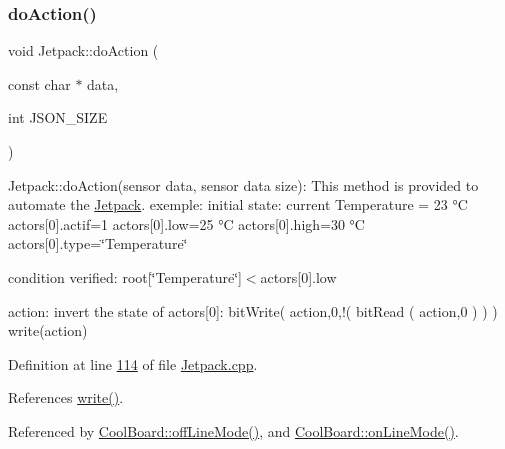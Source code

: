 \subsubsection{\texorpdfstring{do\+Action()}{doAction()}}
{\footnotesize\ttfamily void Jetpack\+::do\+Action (\begin{DoxyParamCaption}\item[{const char $\ast$}]{data,  }\item[{int}]{J\+S\+O\+N\+\_\+\+S\+I\+ZE }\end{DoxyParamCaption})}

Jetpack\+::do\+Action(sensor data, sensor data size)\+: This method is provided to automate the \hyperlink{class_jetpack}{Jetpack}. exemple\+: initial state\+: current Temperature = 23 °C actors\mbox{[}0\mbox{]}.actif=1 actors\mbox{[}0\mbox{]}.low=25 °C actors\mbox{[}0\mbox{]}.high=30 °C actors\mbox{[}0\mbox{]}.type=\char`\"{}\+Temperature\char`\"{}

condition verified\+: root\mbox{[}\char`\"{}\+Temperature\char`\"{}\mbox{]}$<$actors\mbox{[}0\mbox{]}.low

action\+: invert the state of actors\mbox{[}0\mbox{]}\+: bit\+Write( action,0,!( bit\+Read ( action,0 ) ) ) write(action) 

Definition at line \hyperlink{_jetpack_8cpp_source_l00114}{114} of file \hyperlink{_jetpack_8cpp_source}{Jetpack.\+cpp}.



References \hyperlink{_jetpack_8cpp_source_l00043}{write()}.



Referenced by \hyperlink{_cool_board_8cpp_source_l00187}{Cool\+Board\+::off\+Line\+Mode()}, and \hyperlink{_cool_board_8cpp_source_l00097}{Cool\+Board\+::on\+Line\+Mode()}.


